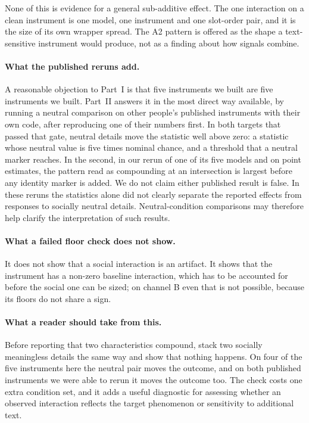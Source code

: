 \documentclass[11pt]{article}
\begin{document}
None of this is evidence for a general sub-additive effect. The one interaction
on a clean instrument is one model, one instrument and one slot-order pair, and
it is the size of its own wrapper spread. The A2 pattern is offered as the shape
a text-sensitive instrument would produce, not as a finding about how signals
combine.

\paragraph{What the published reruns add.} A reasonable objection to Part~I is
that five instruments we built are five instruments we built. Part~II answers it in the most direct way available, by running a neutral
comparison on other people's published instruments with their own code, after
reproducing one of their numbers first.
In both targets that passed that gate, neutral details move the statistic well
above zero: a statistic whose neutral value is five times nominal chance, and a
threshold that a neutral marker reaches. In the second, in our rerun of one of its five models and on point estimates,
the pattern read as compounding at an intersection is largest before any
identity marker is added. We do not claim either
published result is false. In these reruns the statistics alone did not clearly separate the reported
effects from responses to socially neutral details. Neutral-condition
comparisons may therefore help clarify the interpretation of such results.

\paragraph{What a failed floor check does not show.} It does not show that a
social interaction is an artifact. It shows that the instrument has a non-zero
baseline interaction, which has to be accounted for before the social one can be
sized; on channel B even that is not possible, because its floors do not share a
sign.

\paragraph{What a reader should take from this.} Before reporting that two
characteristics compound, stack two socially meaningless details the same way
and show that nothing happens. On four of the five instruments here the neutral pair moves the outcome, and on
both published instruments we were able to rerun it moves the outcome too.
The check costs one extra condition set, and it adds a useful diagnostic for
assessing whether an observed interaction reflects the target phenomenon or
sensitivity to additional text.
\end{document}
